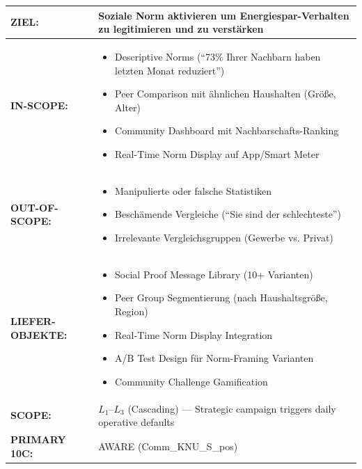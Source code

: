 \begin{tcolorbox}[colback=blue!5!white, colframe=blue!75!black,
    title=\textbf{Social Proof Reminder --- Full Specification}]

\begin{tabular}{@{}p{2.5cm}p{10cm}@{}}
\textbf{ZIEL:} & Soziale Norm aktivieren um Energiespar-Verhalten zu legitimieren und zu verstärken \\
\midrule
\textbf{IN-SCOPE:} &
\begin{itemize}[nosep,leftmargin=*]
    \item[\checkmark] Descriptive Norms (``73\% Ihrer Nachbarn haben letzten Monat reduziert'')
    \item[\checkmark] Peer Comparison mit ähnlichen Haushalten (Größe, Alter)
    \item[\checkmark] Community Dashboard mit Nachbarschafts-Ranking
    \item[\checkmark] Real-Time Norm Display auf App/Smart Meter
\end{itemize} \\
\midrule
\textbf{OUT-OF-SCOPE:} &
\begin{itemize}[nosep,leftmargin=*]
    \item[$\times$] Manipulierte oder falsche Statistiken
    \item[$\times$] Beschämende Vergleiche (``Sie sind der schlechteste'')
    \item[$\times$] Irrelevante Vergleichsgruppen (Gewerbe vs. Privat)
\end{itemize} \\
\midrule
\textbf{LIEFER-OBJEKTE:} &
\begin{itemize}[nosep,leftmargin=*]
    \item[$\square$] Social Proof Message Library (10+ Varianten)
    \item[$\square$] Peer Group Segmentierung (nach Haushaltsgröße, Region)
    \item[$\square$] Real-Time Norm Display Integration
    \item[$\square$] A/B Test Design für Norm-Framing Varianten
    \item[$\square$] Community Challenge Gamification
\end{itemize} \\
\midrule
\textbf{SCOPE:} & $L_1$--$L_3$ (Cascading) --- Strategic campaign triggers daily operative defaults \\
\textbf{PRIMARY 10C:} & AWARE (Comm\_KNU\_S\_pos) \\
\end{tabular}

\end{tcolorbox}

